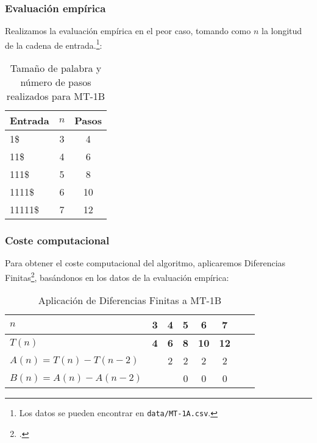 \subsubsection*{Evaluación empírica}
Realizamos la evaluación empírica en el peor caso, tomando como $n$ la longitud de la cadena de entrada.\footnote{Los datos se pueden encontrar en \texttt{data/MT-1A.csv}.}:

\begin{table}[h]
    \centering
    \begin{tabular}{lcc}
        Entrada                    & $n$ & Pasos \\
        \hline
        1\$                       & 3  &  4  \\
        11\$                      & 4  &  6  \\
        111\$                     & 5  &  8  \\
        1111\$                    & 6  &  10  \\
        11111\$                   & 7  &  12  \\
    \end{tabular}
    \caption{Tamaño de palabra y número de pasos realizados para MT-1B}
\end{table}


\subsubsection*{Coste computacional}
Para obtener el coste computacional del algoritmo, aplicaremos Diferencias Finitas\footcite[ver][pgs. 1-42: \textit{Chapter 1. Difference Tables and Polynomial Fits}]{cuoco2005mathematical}, basándonos en los datos de la evaluación empírica:

\begin{table}[h]
    \centering
    \begin{tabular}{|l|c|c|c|c|c|c|c|}
        \hline
        $n$ & \textbf{3} & \textbf{4} & \textbf{5} & \textbf{6} & \textbf{7}\\ \hline
        $T(n)$ & \textbf{4} & \textbf{6} & \textbf{8} & \textbf{10} & \textbf{12}      \\ \hline
        \hline
        $A(n) = T(n) - T(n-2)$ &    & 2 & 2 & 2 & 2 \\ \hline
        $B(n) = A(n) - A(n-2)$ &    &   & 0 & 0 & 0 \\ \hline
    \end{tabular}
    \caption{Aplicación de Diferencias Finitas a MT-1B}
\end{table}

